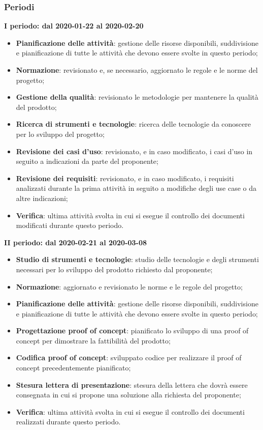 \subsubsection{Periodi}
\textbf{I periodo: dal 2020-01-22 al 2020-02-20}
\begin{itemize}
	\item \textbf{Pianificazione delle attività}: gestione delle risorse disponibili, suddivisione e pianificazione di tutte le attività che devono essere svolte in questo periodo;
	\item \textbf{Normazione}: revisionato e, se necessario, aggiornato le regole e le norme del progetto;
	\item \textbf{Gestione della qualità}: revisionato le metodologie per mantenere la qualità del prodotto;
	\item \textbf{Ricerca di strumenti e tecnologie}: ricerca delle tecnologie da conoscere per lo sviluppo del progetto;
	\item \textbf{Revisione dei casi d'uso}: revisionato, e in caso modificato, i casi d'uso in seguito a indicazioni da parte del proponente;
	\item \textbf{Revisione dei requisiti}: revisionato, e in caso modificato, i requisiti analizzati durante la prima attività in seguito a modifiche degli use case o da altre indicazioni; 
	\item \textbf{Verifica}: ultima attività svolta in cui si esegue il controllo dei documenti modificati durante questo periodo.
\end{itemize}

\textbf{II periodo: dal 2020-02-21 al 2020-03-08}
\begin{itemize}
	\item \textbf{Studio di strumenti e tecnologie}: studio delle tecnologie e degli strumenti necessari per lo sviluppo del prodotto richiesto dal proponente;
	\item \textbf{Normazione}: aggiornato e revisionato le norme e le regole del progetto;
	\item \textbf{Pianificazione delle attività}: gestione delle risorse disponibili, suddivisione e pianificazione di tutte le attività che devono essere svolte in questo periodo;
	\item \textbf{Progettazione proof of concept}: pianificato lo sviluppo di una proof of concept per dimostrare la fattibilità del prodotto;
	\item \textbf{Codifica proof of concept}: sviluppato codice per realizzare il proof of concept precedentemente pianificato;
	\item \textbf{Stesura lettera di presentazione}: stesura della lettera che dovrà essere consegnata in cui si propone una soluzione alla richiesta del proponente;
	\item \textbf{Verifica}: ultima attività svolta in cui si esegue il controllo dei documenti realizzati durante questo periodo.
\end{itemize}

